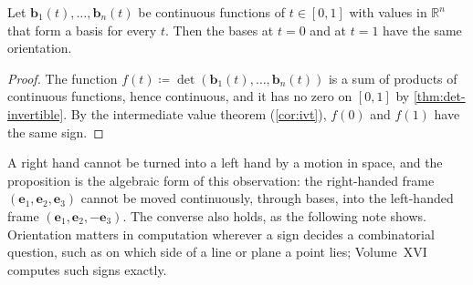 \begin{proposition}
\label{prop:orientation-continuous}
Let $\mathbf b_1(t),\ldots,\mathbf b_n(t)$ be continuous functions of $t\in[0,1]$ with values in $\mathbb R^n$ that form a basis for every $t$. Then the bases at $t=0$ and at $t=1$ have the same orientation.
\end{proposition}

\begin{proof}
The function $f(t)\coloneqq\det(\mathbf b_1(t),\ldots,\mathbf b_n(t))$ is a sum of products of continuous functions, hence continuous, and it has no zero on $[0,1]$ by \cref{thm:det-invertible}. By the intermediate value theorem (\cref{cor:ivt}), $f(0)$ and $f(1)$ have the same sign.
\end{proof}

A right hand cannot be turned into a left hand by a motion in space, and the proposition is the algebraic form of this observation: the right-handed frame $(\mathbf e_1,\mathbf e_2,\mathbf e_3)$ cannot be moved continuously, through bases, into the left-handed frame $(\mathbf e_1,\mathbf e_2,-\mathbf e_3)$. The converse also holds, as the following note shows. Orientation matters in computation wherever a sign decides a combinatorial question, such as on which side of a line or plane a point lies; Volume~XVI computes such signs exactly.

